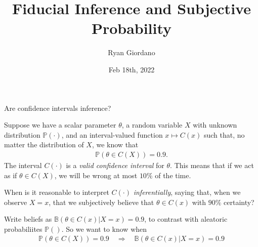 \documentclass[8pt]{beamer}\usepackage[]{graphicx}\usepackage[]{color}
\title{Fiducial Inference and Subjective Probability}
\author{Ryan Giordano}
\date{Feb 18th, 2022}
\institute{Massachusetts Institute of Technology}
\def\p#1{\mathbb{P}\left(#1\right)}
\def\b#1{\mathbb{B}\left(#1\right)}
\begin{document}

\begin{frame}{Are confidence intervals inference?}

Suppose we have a scalar parameter $\theta$, a random variable $X$ with unknown
distribution $\p{\cdot}$, and an interval-valued function $x \mapsto C(x)$ such
that, no matter the distribution of $X$, we know that
%
\begin{align*}
%
\p{\theta \in C(X)} = 0.9.
%
\end{align*}
%
The interval $C(\cdot)$ is a {\em valid confidence interval} for $\theta$. This
means that if we act as if $\theta \in C(X)$, we will be wrong at most $10\%$ of
the time.

\pause

When is it reasonable to interpret $C(\cdot)$ {\em inferentially}, saying
that, when we observe $X=x$, that we subjectively believe that $\theta \in C(x)$
with $90\%$ certainty?

Write beliefs as $\b{\theta \in C(x) | X = x} = 0.9$, to contrast with aleatoric
probabiliites $\p{}$. So we want to know when
%
\begin{align*}
%
\p{\theta \in C(X)} = 0.9 \quad \Rightarrow \quad
\b{\theta \in C(x) | X = x} = 0.9
%
\end{align*}
%
\end{frame}



\end{document}
